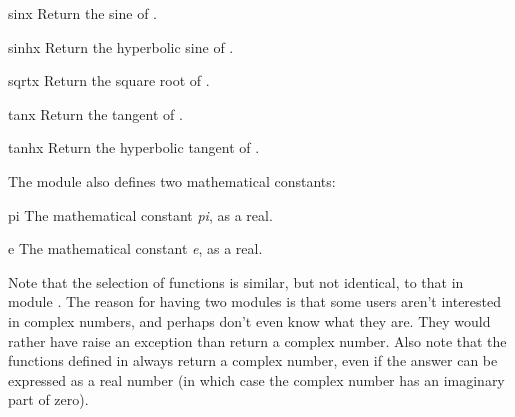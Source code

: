\begin{funcdesc}{sin}{x}
Return the sine of .
\end{funcdesc}

\begin{funcdesc}{sinh}{x}
Return the hyperbolic sine of .
\end{funcdesc}

\begin{funcdesc}{sqrt}{x}
Return the square root of .
\end{funcdesc}

\begin{funcdesc}{tan}{x}
Return the tangent of .
\end{funcdesc}

\begin{funcdesc}{tanh}{x}
Return the hyperbolic tangent of .
\end{funcdesc}

The module also defines two mathematical constants:

\begin{datadesc}{pi}
The mathematical constant \emph{pi}, as a real.
\end{datadesc}

\begin{datadesc}{e}
The mathematical constant \emph{e}, as a real.
\end{datadesc}

Note that the selection of functions is similar, but not identical, to
that in module .  The reason for having
two modules is that some users aren't interested in complex numbers,
and perhaps don't even know what they are.  They would rather have
 raise an exception than return a complex number.
Also note that the functions defined in  always return a
complex number, even if the answer can be expressed as a real number
(in which case the complex number has an imaginary part of zero).
